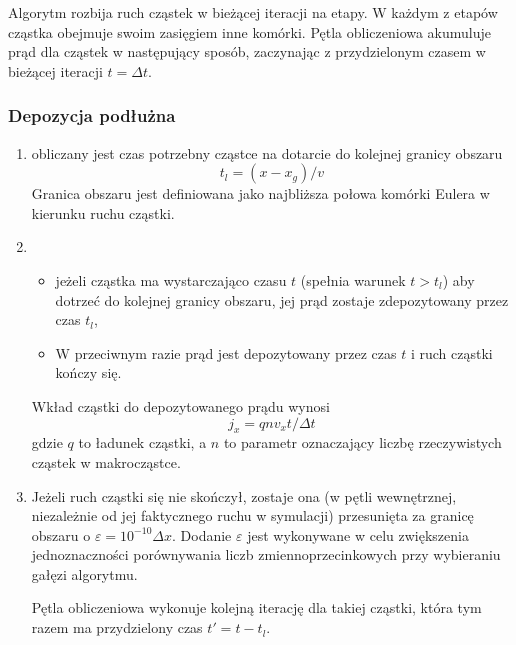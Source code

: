Algorytm rozbija ruch cząstek w bieżącej iteracji na etapy. W każdym z
etapów cząstka obejmuje swoim zasięgiem inne komórki. Pętla obliczeniowa
akumuluje prąd dla cząstek w następujący sposób, zaczynając z przydzielonym
czasem w bieżącej iteracji $t = \Delta t$.

\subsubsection{Depozycja podłużna}
\begin{enumerate}
    \item obliczany jest czas potrzebny cząstce na dotarcie do kolejnej
    granicy obszaru
    \begin{equation}
        t_l = (x - x_g)/v
    \end{equation}
    Granica obszaru jest definiowana jako najbliższa połowa komórki Eulera w kierunku
    ruchu cząstki.
    \item
    \begin{itemize}
        \item jeżeli cząstka ma wystarczająco czasu $t$ (spełnia warunek $t > t_l$) aby
        dotrzeć do kolejnej granicy obszaru, jej prąd zostaje zdepozytowany przez czas $t_l$,
        \item W przeciwnym razie prąd jest depozytowany przez czas $t$ i ruch cząstki kończy się.
    \end{itemize}
    Wkład cząstki do depozytowanego prądu wynosi
    \begin{equation}
        j_x = q n v_x t/\Delta t
    \end{equation}
    gdzie $q$ to ładunek cząstki, a $n$ to parametr  oznaczający liczbę
    rzeczywistych cząstek w makrocząstce.

    \item Jeżeli ruch cząstki się nie skończył, zostaje ona (w pętli
    wewnętrznej, niezależnie od jej faktycznego ruchu w symulacji)
     przesunięta za granicę obszaru o $\varepsilon =
    10^{-10} \Delta x$. Dodanie $\varepsilon$ jest wykonywane w celu zwiększenia
    jednoznaczności porównywania liczb zmiennoprzecinkowych przy wybieraniu
    gałęzi algorytmu.

    Pętla obliczeniowa wykonuje kolejną iterację dla takiej cząstki, która tym razem
    ma przydzielony czas $t' = t - t_l$.

\end{enumerate}

